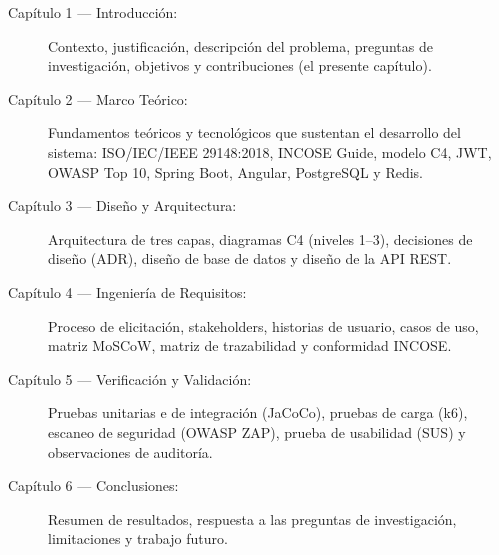 \begin{description}
  \item[Capítulo 1 — Introducción:] Contexto, justificación, descripción del problema, preguntas de investigación, objetivos y contribuciones (el presente capítulo).

  \item[Capítulo 2 — Marco Teórico:] Fundamentos teóricos y tecnológicos que sustentan el desarrollo del sistema: ISO/IEC/IEEE 29148:2018, INCOSE Guide, modelo C4, JWT, OWASP Top 10, Spring Boot, Angular, PostgreSQL y Redis.

  \item[Capítulo 3 — Diseño y Arquitectura:] Arquitectura de tres capas, diagramas C4 (niveles 1--3), decisiones de diseño (ADR), diseño de base de datos y diseño de la API REST.

  \item[Capítulo 4 — Ingeniería de Requisitos:] Proceso de elicitación, stakeholders, historias de usuario, casos de uso, matriz MoSCoW, matriz de trazabilidad y conformidad INCOSE.

  \item[Capítulo 5 — Verificación y Validación:] Pruebas unitarias e de integración (JaCoCo), pruebas de carga (k6), escaneo de seguridad (OWASP ZAP), prueba de usabilidad (SUS) y observaciones de auditoría.

  \item[Capítulo 6 — Conclusiones:] Resumen de resultados, respuesta a las preguntas de investigación, limitaciones y trabajo futuro.
\end{description}
